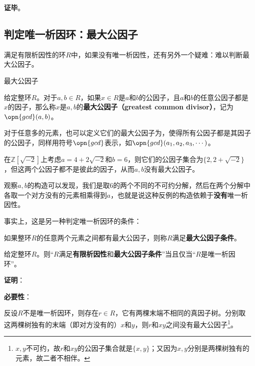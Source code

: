 \textbf{证毕}。







\subsection{判定唯一析因环：最大公因子}



满足有限析因性的环$R$中，如果没有唯一析因性，还有另外一个疑难：难以判断最大公因子。


\begin{definition}{最大公因子}

给定整环$R$。对于$a, b\in R$，如果$x\in R$是$a$和$b$的公因子，且$a$和$b$的任意公因子都是$x$的因子，那么称$x$是$a, b$的\textbf{最大公因子（greatest common divisor）}，记为$\opn{gcd}(a, b)$。

对于任意多的元素，也可以定义它们的最大公因子为，使得所有公因子都是其因子的公因子，同样用符号$\opn{gcd}$表示，如$\opn{gcd}(a_1, a_2, a_3, \cdots)$。

\end{definition}


在$\mathbb{Z}[\sqrt{-2}]$上考虑$a=4+2\sqrt{-2}$和$b=6$，则它们的公因子集合为$\{2, 2+\sqrt{-2}\}$，但这两个公因子都不是彼此的因子，从而$a, b$没有最大公因子。

观察$a, b$的构造可以发现，我们是取$6$的两个不同的不可约分解，然后在两个分解中各取一个对方没有的元素相乘得到$a$，也就是说这种反例的构造依赖于\textbf{没有}唯一析因性。

事实上，这是另一种判定唯一析因环的条件：



\begin{definition}{}
如果整环$R$的任意两个元素之间都有最大公因子，则称$R$满足\textbf{最大公因子条件}。
\end{definition}


\begin{theorem}{}
给定整环$R$。则“$R$满足\textbf{有限析因性}和\textbf{最大公因子条件}”当且仅当“$R$是唯一析因环”。
\end{theorem}


\textbf{证明}：

\textbf{必要性}：

反设$R$不是唯一析因环，则存在$r\in R$，它有两棵末端不相同的真因子树。分别取这两棵树独有的末端（即对方没有的）$x$和$y$，则$r$和$xy$之间没有最大公因子\footnote{$x, y$不可约，故$r$和$xy$的公因子集合就是$\{x, y\}$；又因为$x, y$分别是两棵树独有的元素，故二者不相伴。}。

